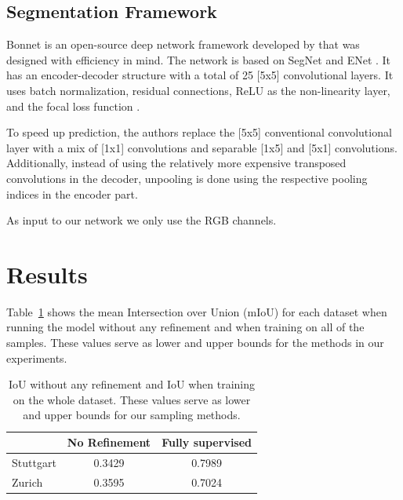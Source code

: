 \documentclass[letterpaper, 10 pt, conference]{ieeeconf}  %
\begin{document}


\subsection{Segmentation Framework} \label{sec:seg_framework}


Bonnet is an open-source deep network framework developed by \cite{milioto2018bonnet} that was designed with efficiency in mind. The network is based on SegNet \cite{badrinarayanan2017segnet} and ENet \cite{paszke2016enet}. It has an encoder-decoder structure with a total of 25 [5x5] convolutional layers. It uses batch normalization, residual connections, ReLU as the non-linearity layer, and the focal loss function \cite{DBLP:conf/iccv/LinGGHD17}.

To speed up prediction, the authors replace the [5x5] conventional convolutional layer with a mix of [1x1] convolutions and separable [1x5] and [5x1] convolutions. Additionally, instead of using the relatively more expensive transposed convolutions in the decoder, unpooling is done using the respective pooling indices in the encoder part.

As input to our network we only use the RGB channels.


\section{Results}


Table~\ref{tab:null_and_fully_supervised} shows the mean Intersection over Union (mIoU) for each dataset when running the model without any refinement and when training on all of the samples. These values serve as lower and upper bounds for the methods in our experiments.

            \begin{table}
          \vspace{1em}
        \centering
        \caption{IoU without any refinement and IoU when training on the whole dataset. These values serve as lower and upper bounds for our sampling methods.}
        \begin{tabular}{@{}lcc@{}} 
            \toprule
              &  No Refinement  & Fully supervised \\ 
            \midrule 
    		  Stuttgart  & 0.3429 & 0.7989  \\ \addlinespace
    		  Zurich  & 0.3595 & 0.7024  \\
    	
            \bottomrule
        \end{tabular}
        \label{tab:null_and_fully_supervised}
    \end{table}
\end{document}
